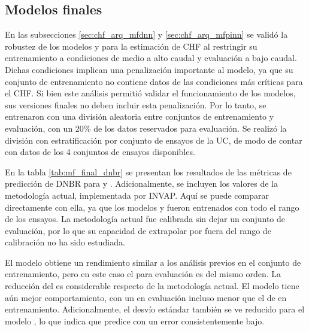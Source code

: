 

\subsection{Modelos finales}
\label{sec:chf_modelos_finales}
En las subsecciones \ref{sec:chf_arq_mfdnn} y \ref{sec:chf_arq_mfpinn} se validó la robustez de los modelos \mfdnn{} y \mfpinn{} para la estimación de CHF al restringir su entrenamiento a condiciones de medio a alto caudal y evaluación a bajo caudal. Dichas condiciones implican una penalización importante al modelo, ya que su conjunto de entrenamiento no contiene datos de las condiciones más críticas para el CHF. Si bien este análisis permitió validar el funcionamiento de los modelos, sus versiones finales no deben incluir esta penalización. Por lo tanto, se entrenaron con una división aleatoria entre conjuntos de entrenamiento y evaluación, con un 20\% de los datos reservados para evaluación. Se realizó la división con estratificación por conjunto de ensayos de la UC, de modo de contar con datos de los 4 conjuntos de ensayos disponibles.

En la tabla \ref{tab:mf_final_dnbr} se presentan los resultados de las métricas de predicción de $\mathrm{DNBR}$ para \mfdnn{} y \mfpinn{}. Adicionalmente, se incluyen los valores de la metodología actual, implementada por INVAP. Aquí se puede comparar directamente con ella, ya que los modelos \mfdnn{} y \mfpinn{} fueron entrenados con todo el rango de los ensayos. La metodología actual fue calibrada sin dejar un conjunto de evaluación, por lo que su capacidad de extrapolar por fuera del rango de calibración no ha sido estudiada.

El modelo \mfdnn{} obtiene un rendimiento similar a los análisis previos en el conjunto de entrenamiento, pero en este caso el \dnbrmin{} para evaluación es del mismo orden. La reducción del \dnbrmin{} es considerable respecto de la metodología actual. El modelo \mfpinn{} tiene aún mejor comportamiento, con un \dnbrmin{} en evaluación incluso menor que el de \mfdnn{} en entrenamiento. Adicionalmente, el desvío estándar también se ve reducido para el modelo \mfpinn{}, lo que indica que predice con un error consistentemente bajo.


